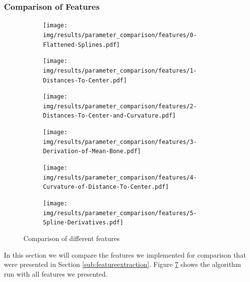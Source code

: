 \documentclass[pdftex,12pt,a4paper]{report}
\begin{document}
\subsubsection{Comparison of Features}

\begin{figure}[h]
	\centering
	\begin{subfigure}[b]{0.32\textwidth}
		\centering
		\texttt{[image: img/results/parameter\_comparison/features/0-Flattened-Splines.pdf]}
		\label{fig:features-0}
	\end{subfigure}
	\begin{subfigure}[b]{0.32\textwidth}
		\centering
		\texttt{[image: img/results/parameter\_comparison/features/1-Distances-To-Center.pdf]}
		\label{fig:features-1}
	\end{subfigure}
	\begin{subfigure}[b]{0.32\textwidth}
		\centering
		\texttt{[image: img/results/parameter\_comparison/features/2-Distances-To-Center-and-Curvature.pdf]}
		\label{fig:features-2}
	\end{subfigure}
	\begin{subfigure}[b]{0.32\textwidth}
		\centering
		\texttt{[image: img/results/parameter\_comparison/features/3-Derivation-of-Mean-Bone.pdf]}
		\label{fig:features-3}
	\end{subfigure}
	\begin{subfigure}[b]{0.32\textwidth}
		\centering
		\texttt{[image: img/results/parameter\_comparison/features/4-Curvature-of-Distance-To-Center.pdf]}
		\label{fig:features-4}
	\end{subfigure}
	\begin{subfigure}[b]{0.32\textwidth}
		\centering
		\texttt{[image: img/results/parameter\_comparison/features/5-Spline-Derivatives.pdf]}
		\label{fig:features-5}
	\end{subfigure}
	\caption{Comparison of different features}
	\label{fig:features}
\end{figure}

In this section we will compare the features we implemented for comparison that were presented in Section \ref{sub:featureextraction}. Figure \ref{fig:features} shows the algorithm run with all features we presented.
\end{document}
